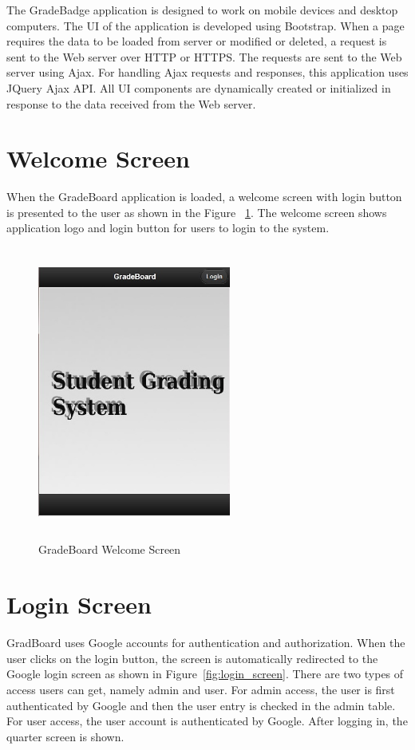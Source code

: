 
The GradeBadge application is designed to work on mobile devices and desktop computers. The UI of the application is developed using Bootstrap. When a page requires the data to be loaded from server or modified or deleted, a request is sent to the Web server over HTTP or HTTPS. The requests are sent to the Web server using Ajax. For handling Ajax requests and responses, this application uses JQuery Ajax API. All UI components are dynamically created or initialized in response to the data received from the Web server.

\newpage
\section{Welcome Screen}
When the GradeBoard application is loaded, a welcome screen with login button is presented to the user as shown in the Figure ~\ref{fig:welcome_screen}. The welcome screen shows application logo and login button for users to login to the system.

\vspace{3em}
\begin{figure}[H]
\begin{center}
\includegraphics[height=3.8in,width=2.5in]{images/welcome_screen.jpg}
\caption{GradeBoard Welcome Screen}
\label{fig:welcome_screen}
\end{center}
\end{figure}

\newpage
\section{Login Screen}
GradBoard uses Google accounts for authentication and authorization. When the user clicks on the login button, the screen is automatically redirected to the Google login screen as shown in Figure~\ref{fig:login_screen}. There are two types of access users can get, namely admin and user. For admin access, the user is first authenticated by Google and then the user entry is checked in the admin table.  For user access, the user account is authenticated by Google. After logging in, the quarter screen is shown.

